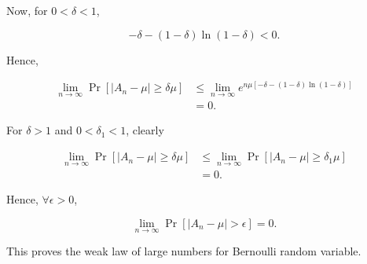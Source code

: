 Now, for $0<\delta<1$,

\begin{equation*}
    -\delta-(1-\delta)\ln(1-\delta) < 0.
\end{equation*}

Hence,

\begin{equation*}
    \begin{aligned}
        \lim_{n\rightarrow\infty}\Pr[|A_n-\mu| \ge \delta\mu] &\le
        \lim_{n\rightarrow\infty}e^{n\mu[-\delta-(1-\delta)\ln(1-\delta)]} \\
        &= 0.
    \end{aligned}
\end{equation*}

For $\delta>1$ and $0<\delta_1<1$, clearly

\begin{equation*}
    \begin{aligned}
        \lim_{n\rightarrow\infty}\Pr[|A_n-\mu|\ge\delta\mu] &\le
        \lim_{n\rightarrow\infty}\Pr[|A_n-\mu|\ge\delta_1\mu] \\
        &= 0.
    \end{aligned}
\end{equation*}

Hence, $\forall\epsilon>0$,

\begin{equation*}
    \lim_{n\rightarrow\infty}\Pr[|A_n-\mu| > \epsilon] = 0.
\end{equation*}

This proves the weak law of large numbers for Bernoulli random variable.
